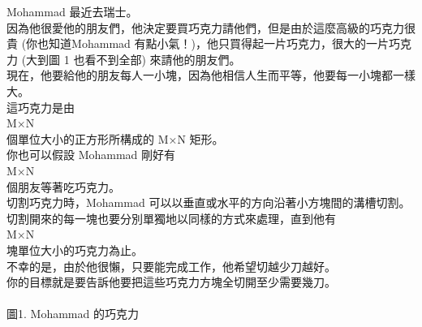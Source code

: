 Mohammad 最近去瑞士。\\
因為他很愛他的朋友們，他決定要買巧克力請他們，但是由於這麼高級的巧克力很貴 (你也知道Mohammad 有點小氣！)，他只買得起一片巧克力，很大的一片巧克力 (大到圖 1 也看不到全部) 來請他的朋友們。\\
現在，他要給他的朋友每人一小塊，因為他相信人生而平等，他要每一小塊都一樣大。\\
這巧克力是由\\
M×N\\
個單位大小的正方形所構成的 M×N 矩形。\\
你也可以假設 Mohammad 剛好有\\
M×N\\
個朋友等著吃巧克力。\\
切割巧克力時，Mohammad 可以以垂直或水平的方向沿著小方塊間的溝槽切割。\\
切割開來的每一塊也要分別單獨地以同樣的方式來處理，直到他有\\
M×N\\
塊單位大小的巧克力為止。\\
不幸的是，由於他很懶，只要能完成工作，他希望切越少刀越好。\\
你的目標就是要告訴他要把這些巧克力方塊全切開至少需要幾刀。\\
\\
圖1. Mohammad 的巧克力